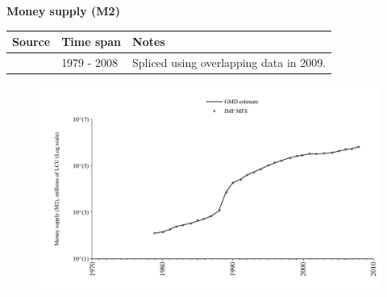 \documentclass[12pt,a4paper,landscape]{article}
\begin{document}
\begin{adjustbox}{max totalsize={\paperwidth}{\paperheight},center}
\begin{minipage}[t][\textheight][t]{\textwidth}
\vspace*{0.5cm}
{}
\begin{center}
{\Large\bfseries Money supply (M2)}
\end{center}
\vspace{0.5cm}
\begin{table}[H]
\centering
\small
\begin{tabular}{|l|l|l|}
\hline
\textbf{Source} & \textbf{Time span} & \textbf{Notes} \\
\hline
\rowcolor{white}\cite{IMF_MFS}& 1979 - 2008 &Spliced using overlapping data in 2009. \\
\hline
\end{tabular}
\end{table}
\begin{figure}[H]
\centering
\includegraphics[width=\textwidth,height=0.6\textheight,keepaspectratio]{graphs/POL_M2.pdf}
\end{figure}
\end{minipage}
\end{adjustbox}
\end{document}
